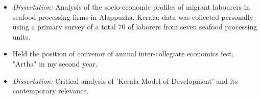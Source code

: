 \documentclass[9pt,a4paper]{altacv}
\begin{document}
\begin{paracol}{2}
\begin{itemize}
    \item \textit{Dissertation:} Analysis of the socio-economic profiles of migrant labourers in seafood processing firms in Alappuzha, Kerala; data was collected personally using a primary survey of a total 70 of laborers from seven seafood processing units.
    \item Held the position of convenor of annual inter-collegiate economics fest, "Artha" in my second year.
\end{itemize}
\divider
{}
\begin{itemize}
    \item \textit{Dissertation:} Critical analysis of ’Kerala Model of Development’ and its contemporary relevance.
\end{itemize}
\switchcolumn
{}



\end{paracol}
\end{document}

